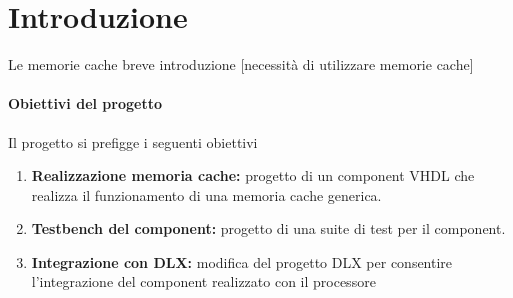 \clearpage{\pagestyle{empty}\cleardoublepage}
\chapter*{Introduzione} 


Le memorie cache breve introduzione [necessit\`a di utilizzare memorie cache]



\subsubsection{Obiettivi del progetto}
Il progetto si prefigge i seguenti obiettivi

\begin{enumerate}

\item \textbf{Realizzazione memoria cache:}
progetto di un component VHDL che realizza il funzionamento di una memoria cache generica.

\item \textbf{Testbench del component:} progetto di una suite di test per il component.

\item \textbf{Integrazione con DLX:} modifica del progetto DLX per consentire l'integrazione del component realizzato con il processore

\end{enumerate}